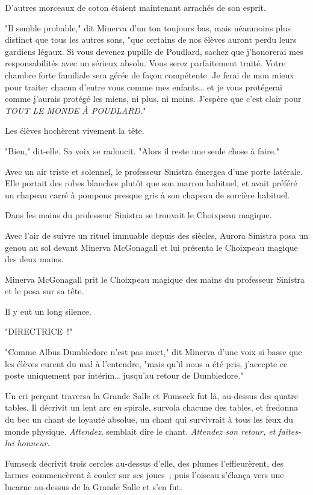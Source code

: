 D'autres morceaux de coton étaient maintenant arrachés de son esprit.

"Il semble probable," dit Minerva d'un ton toujours bas, mais néanmoins plus distinct que tous les autres sons, "que certains de nos élèves auront perdu leurs gardiens légaux. Si vous devenez pupille de Poudlard, sachez que j'honorerai mes responsabilités avec un sérieux absolu. Vous serez parfaitement traité. Votre chambre forte familiale sera gérée de façon compétente. Je ferai de mon mieux pour traiter chacun d'entre vous comme mes enfants… et je vous protégerai comme j'aurais protégé les miens, ni plus, ni moins. J'espère que c'est clair pour \emph{TOUT LE MONDE À POUDLARD.}"

Les élèves hochèrent vivement la tête.

"Bien," dit-elle. Sa voix se radoucit. "Alors il reste une seule chose à faire."

Avec un air triste et solennel, le professeur Sinistra émergea d'une porte latérale. Elle portait des robes blanches plutôt que son marron habituel, et avait préféré un chapeau carré à pompons presque gris à son chapeau de sorcière habituel.

Dans les mains du professeur Sinistra se trouvait le Choixpeau magique.

Avec l'air de suivre un rituel immuable depuis des siècles, Aurora Sinistra posa un genou au sol devant Minerva McGonagall et lui présenta le Choixpeau magique des deux mains.

Minerva McGonagall prit le Choixpeau magique des mains du professeur Sinistra et le posa sur sa tête.

Il y eut un long silence.

"DIRECTRICE~!"

"Comme Albus Dumbledore n'est pas mort," dit Minerva d'une voix si basse que les élèves eurent du mal à l'entendre, "mais qu'il nous a été pris, j'accepte ce poste uniquement par intérim… jusqu'au retour de Dumbledore."

Un cri perçant traversa la Grande Salle et Fumseck fut là, au-dessus des quatre tables. Il décrivit un lent arc en spirale, survola chacune des tables, et fredonna du bec un chant de loyauté absolue, un chant qui survivrait à tous les feux du monde physique. \emph{Attendez}, semblait dire le chant. \emph{Attendez son retour, et faites-lui honneur.}

Fumseck décrivit trois cercles au-dessus d'elle, des plumes l'effleurèrent, des larmes commencèrent à couler sur ses joues~; puis l'oiseau s'élança vers une lucarne au-dessus de la Grande Salle et s'en fut. 

